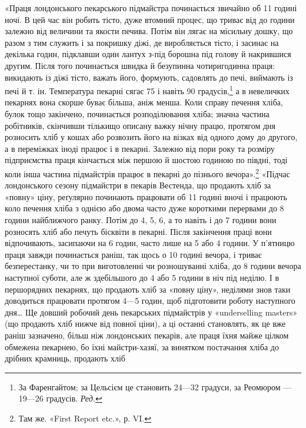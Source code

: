 «Праця лондонського пекарського підмайстра починається
звичайно об 11 годині ночі. В цей час він робить тісто, дуже втомний
процес, що триває від  до  години залежно від величини
та якости печива. Потім він лягає на місильну дошку, що разом
з тим служить і за покришку діжі, де виробляється тісто, і засинає
на декілька годин, підклавши один лантух з-під борошна під
голову й накрившися другим. Після того починається швидка й
безупинна чотиригодинна праця: викидають із діжі тісто, важать
його, формують, садовлять до печі, виймають із печі й т. ін. Температура
пекарні сягає 75 і навіть 90 градусів,\footnote*{
За Фаренгайтом; за Цельсієм це становить 24—32 градуси, за
Реомюром — 19—26 градусів. \emph{Ред.}
} а в невеличких пекарнях
вона скорше буває більша, аніж менша. Коли справу печення
хліба, булок тощо закінчено, починається розподілювання хліба;
значна частина робітників, скінчивши тількищо описану важку
нічну працю, протягом дня розносить хліб у кошах або розвозить
його на візках від одного дому до другого, а в переміжках іноді працює
і в пекарні. Залежно від пори року та розміру підприємства
праця кінчається між першою й шостою годиною по півдні, тоді коли
інша частина підмайстрів працює в пекарні до пізнього вечора».\footnote{
Там же. «First Report etc.», р. VI.
}
«Підчас лондонського сезону підмайстри в пекарів Вестенда, що
продають хліб за «повну» ціну, реґулярно починають працювати
об 11 годині вночі і працюють коло печення хліба з однією або
двома часто дуже короткими перервами до 8 години найближчого
ранку. Потім до 4, 5, 6, а то навіть і до 7 години вони розносять
хліб або печуть бісквіти в пекарні. Після закінчення праці вони
відпочивають, засипаючи на 6 годин, часто лише на 5 або 4 години.
У п’ятницю праця завжди починається раніш, так щось о 10 годині
вечора, і триває безперестанку, чи то при виготовленні чи розношуванні
хліба, до 8 години вечора наступної суботи, але ж здебільшого
до 4 або 5 години в ніч під неділю. І в першорядних
пекарнях, що продають хліб за «повну ціну», неділями знов таки
доводиться працювати протягом 4—5 годин, щоб підготовити
роботу наступного дня\dots{} Ще довший робочий день пекарських
підмайстрів у «underselling masters» (що продають хліб нижче
від повної ціни), а ці останні становлять, як це вже раніш зазначено,
більш ніж  лондонських пекарів, але праця їхня
майже цілком обмежена пекарнею, бо їхні майстри-хазяї, за
винятком постачання хліба до дрібних крамниць, продають хліб
\parbreak{}  %
